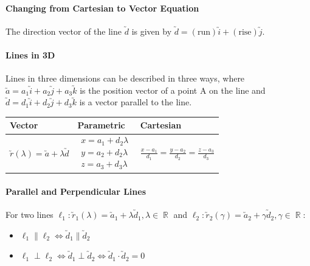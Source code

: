 \documentclass[a4paper,twoside,10pt]{article}
\DeclareMathOperator\R{\mathbb{R}}
\begin{document}
			\paragraph{Changing from Cartesian to Vector Equation} The direction vector of the line $\utilde{d}$ is given by $\utilde{d}=\mathrm{(run)}\utilde{i}+\mathrm{(rise)}\utilde{j}$.
			
			\paragraph{Lines in 3D} Lines in three dimensions can be described in three ways, where $\utilde{a}=a_1\utilde{i}+a_2\utilde{j}+a_3\utilde{k}$ is the position vector of a point A on the line and $\utilde{d}=d_1\utilde{i}+d_2\utilde{j}+d_3\utilde{k}$ is a vector parallel to the line.
			\begin{center}
				\bgroup
				\def\arraystretch{2}
				\begin{tabularx}{\textwidth}{|m{3cm}*2{|X}|}
					\hline
					\centering Vector & Parametric & Cartesian \\
					\hline
					\vspace{2em}
					\centering$\utilde{r}(\lambda)=\utilde{a}+\lambda\utilde{d}$ & $\begin{aligned}
						x=a_1+d_2\lambda \\[1em]
						y=a_2+d_2\lambda \\[1em]
						z=a_3+d_3\lambda
					\end{aligned}$ & \(\frac{x-a_1}{d_1}=\frac{y-a_2}{d_2}=\frac{z-a_3}{d_3}\) \\
					\hline
				\end{tabularx}
				\egroup
			\end{center}
			
			\paragraph{Parallel and Perpendicular Lines} For two lines $\ell_1:\utilde{r}_1(\lambda)=\utilde{a}_1+\lambda\utilde{d}_1,\lambda\in\R$ and $\ell_2:\utilde{r}_2(\gamma)=\utilde{a}_2+\gamma\utilde{d}_2,\gamma\in\R$:
			\begin{itemize}
				\item $\ell_1\parallel\ell_2 \iff \utilde{d}_1\parallel\utilde{d}_2$
				\item $\ell_1\perp\ell_2 \iff \utilde{d}_1\perp\utilde{d}_2 \iff \utilde{d}_1\cdot\utilde{d}_2=0$
			\end{itemize}
		
\end{document}
